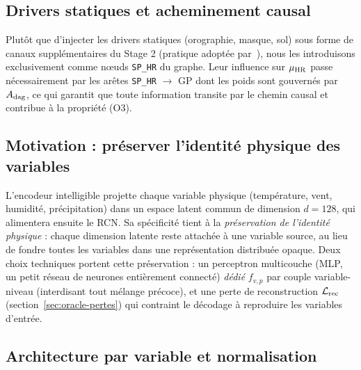 \subsection{Drivers statiques et acheminement causal}
\label{ssec:oracle-statics}

Plutôt que d'injecter les drivers statiques (orographie, masque, sol) sous forme de canaux supplémentaires du Stage 2 (pratique adoptée par~\cite{rampal_cgan_2024}), nous les introduisons exclusivement comme nœuds \texttt{SP\_HR} du graphe. Leur influence sur $\mu_{\text{HR}}$ passe nécessairement par les arêtes \texttt{SP\_HR} $\to$ GP dont les poids sont gouvernés par $A_{\mathrm{dag}}$, ce qui garantit que toute information transite par le chemin causal et contribue à la propriété (O3).

\label{sec:oracle-encoder}

\subsection{Motivation : préserver l'identité physique des variables}
\label{ssec:oracle-encoder-motivation}

L'encodeur intelligible projette chaque variable physique (température, vent, humidité, précipitation) dans un espace latent commun de dimension $d=128$, qui alimentera ensuite le RCN. Sa spécificité tient à la \emph{préservation de l'identité physique} : chaque dimension latente reste attachée à une variable source, au lieu de fondre toutes les variables dans une représentation distribuée opaque. Deux choix techniques portent cette préservation : un perceptron multicouche (MLP, un petit réseau de neurones entièrement connecté) \emph{dédié} $f_{v,p}$ par couple variable-niveau (interdisant tout mélange précoce), et une perte de reconstruction $\mathcal{L}_{\mathrm{rec}}$ (section~\ref{sec:oracle-pertes}) qui contraint le décodage à reproduire les variables d'entrée.

\subsection{Architecture par variable et normalisation}
\label{ssec:oracle-encoder-archi}

